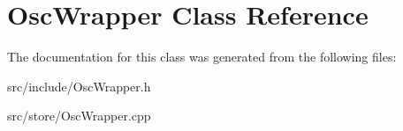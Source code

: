 \hypertarget{classOscWrapper}{\section{Osc\-Wrapper Class Reference}
\label{classOscWrapper}
}


The documentation for this class was generated from the following files\-:\begin{DoxyCompactItemize}
\item 
src/include/Osc\-Wrapper.\-h\item 
src/store/Osc\-Wrapper.\-cpp\end{DoxyCompactItemize}
